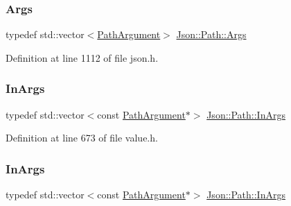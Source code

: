 \hypertarget{class_json_1_1_path_a27d96232d034d7a78286468676f9cb3e}{}\label{class_json_1_1_path_a27d96232d034d7a78286468676f9cb3e} 
\subsubsection{\texorpdfstring{Args}{Args}\hspace{0.1cm}{\footnotesize\ttfamily [2/2]}}
{\footnotesize\ttfamily typedef std\+::vector$<$\hyperlink{class_json_1_1_path_argument}{Path\+Argument}$>$ \hyperlink{class_json_1_1_path_a27d96232d034d7a78286468676f9cb3e}{Json\+::\+Path\+::\+Args}\hspace{0.3cm}{\ttfamily [private]}}



Definition at line 1112 of file json.\+h.

\hypertarget{class_json_1_1_path_ab29d7b2fc896c7d3c5ed4609af3a3f23}{}\label{class_json_1_1_path_ab29d7b2fc896c7d3c5ed4609af3a3f23} 
\subsubsection{\texorpdfstring{In\+Args}{InArgs}\hspace{0.1cm}{\footnotesize\ttfamily [1/2]}}
{\footnotesize\ttfamily typedef std\+::vector$<$const \hyperlink{class_json_1_1_path_argument}{Path\+Argument}$\ast$$>$ \hyperlink{class_json_1_1_path_ab29d7b2fc896c7d3c5ed4609af3a3f23}{Json\+::\+Path\+::\+In\+Args}\hspace{0.3cm}{\ttfamily [private]}}



Definition at line 673 of file value.\+h.

\hypertarget{class_json_1_1_path_ab29d7b2fc896c7d3c5ed4609af3a3f23}{}\label{class_json_1_1_path_ab29d7b2fc896c7d3c5ed4609af3a3f23} 
\subsubsection{\texorpdfstring{In\+Args}{InArgs}\hspace{0.1cm}{\footnotesize\ttfamily [2/2]}}
{\footnotesize\ttfamily typedef std\+::vector$<$const \hyperlink{class_json_1_1_path_argument}{Path\+Argument}$\ast$$>$ \hyperlink{class_json_1_1_path_ab29d7b2fc896c7d3c5ed4609af3a3f23}{Json\+::\+Path\+::\+In\+Args}\hspace{0.3cm}{\ttfamily [private]}}



